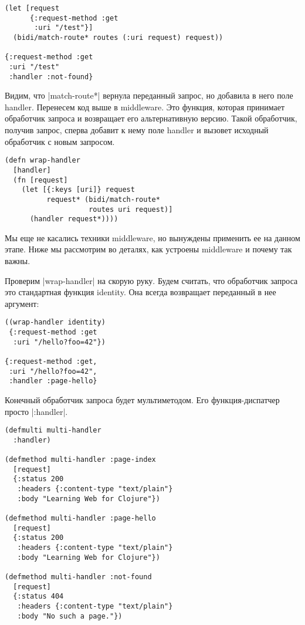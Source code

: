 \begin{verbatim}
(let [request
      {:request-method :get
       :uri "/test"}]
  (bidi/match-route* routes (:uri request) request))

{:request-method :get
 :uri "/test"
 :handler :not-found}
\end{verbatim}

Видим, что \spverb|match-route*| вернула переданный запрос, но добавила в него поле
handler. Перенесем код выше в middleware. Это функция, которая принимает
обработчик запроса и возвращает его альтернативную версию. Такой обработчик,
получив запрос, сперва добавит к нему поле handler и вызовет исходный обработчик
с новым запросом.

\begin{verbatim}
(defn wrap-handler
  [handler]
  (fn [request]
    (let [{:keys [uri]} request
          request* (bidi/match-route*
                    routes uri request)]
      (handler request*))))
\end{verbatim}

Мы еще не касались техники middleware, но вынуждены применить ее на данном
этапе.  Ниже мы рассмотрим во деталях, как устроены middleware и почему так
важны.

Проверим \spverb|wrap-handler| на скорую руку. Будем считать, что обработчик запроса
это стандартная функция identity. Она всегда возвращает переданный в нее
аргумент:

\begin{verbatim}
((wrap-handler identity)
 {:request-method :get
  :uri "/hello?foo=42"})

{:request-method :get,
 :uri "/hello?foo=42",
 :handler :page-hello}
\end{verbatim}

Конечный обработчик запроса будет мультиметодом. Его функция-диспатчер просто
\spverb|:handler|.

\begin{verbatim}
(defmulti multi-handler
  :handler)

(defmethod multi-handler :page-index
  [request]
  {:status 200
   :headers {:content-type "text/plain"}
   :body "Learning Web for Clojure"})

(defmethod multi-handler :page-hello
  [request]
  {:status 200
   :headers {:content-type "text/plain"}
   :body "Learning Web for Clojure"})

(defmethod multi-handler :not-found
  [request]
  {:status 404
   :headers {:content-type "text/plain"}
   :body "No such a page."})
\end{verbatim}

